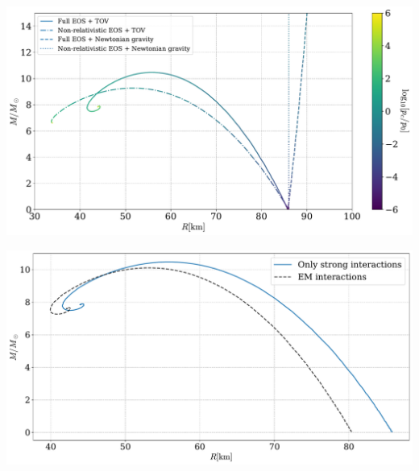 \documentclass[aspectratio=169]{beamer}
\begin{document}
    \begin{frame}
        \includegraphics[width=\textwidth]{../../scripts/figurer/pion_star/mass_radius_comparison.pdf}
    \end{frame}

    \begin{frame}
        \includegraphics[width=\textwidth]{../../scripts/figurer/pion_star/mass_radius_pion_star_compare.pdf}
    \end{frame}
\end{document}
